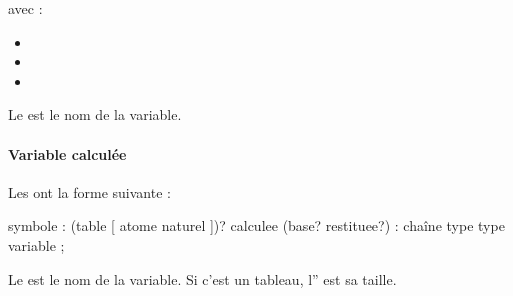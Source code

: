 \documentclass[letterpaper,10pt,french]{sphinxmanual}
\begin{document}
\begin{sphinxVerbatim}[commandchars=\\\{\}]
            
\end{sphinxVerbatim}

\sphinxAtStartPar
avec :
\begin{itemize}
\item {} 
\sphinxAtStartPar
{}

\item {} 
\sphinxAtStartPar
{}

\item {} 
\sphinxAtStartPar
{}

\end{itemize}

\sphinxAtStartPar
Le  est le nom de la variable.


\paragraph{Variable calculée}
\label{\detokenize{syntax:variable-calculee}}
\sphinxAtStartPar
Les  ont la forme suivante :

\begin{sphinxVerbatim}[commandchars=\\\{\}]
\PYGZlt{}symbole\PYGZgt{}
: (table [ \PYGZlt{}atome naturel\PYGZgt{} ])? calculee (base? \PYGZca{} restituee?)
: \PYGZlt{}chaîne\PYGZgt{} type \PYGZlt{}type variable\PYGZgt{} ;
\end{sphinxVerbatim}

\sphinxAtStartPar
Le  est le nom de la variable. Si c’est un tableau, l”
est sa taille.
\end{document}

